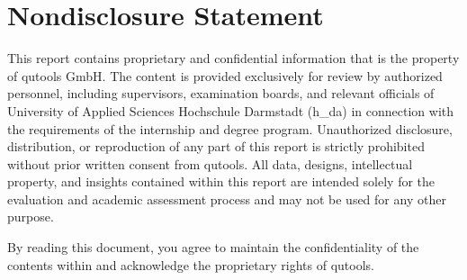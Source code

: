 \thispagestyle{empty} 
\chapter*{Nondisclosure Statement}

This report contains proprietary and confidential information that is the property of qutools GmbH. The content is provided exclusively for review by authorized personnel, including supervisors, examination boards, and relevant officials of University of Applied Sciences Hochschule Darmstadt (h\_da) in connection with the requirements of the internship and degree program. Unauthorized disclosure, distribution, or reproduction of any part of this report is strictly prohibited without prior written consent from qutools. All data, designs, intellectual property, and insights contained within this report are intended solely for the evaluation and academic assessment process and may not be used for any other purpose.

By reading this document, you agree to maintain the confidentiality of the contents within and acknowledge the proprietary rights of qutools.